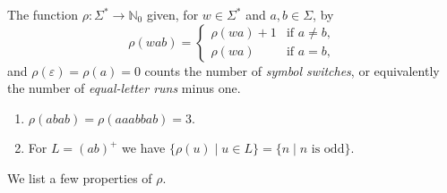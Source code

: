 \label{def:rho}
The function $\rho \colon \Sigma^* \to \mathbb N_0$ given, for $w \in \Sigma^*$ and $a,b \in \Sigma$, by
\[ 
\rho(wab) = \begin{cases} 
	\rho(wa) + 1 & \text{if } a \ne b, \\
	\rho(wa)     & \text{if } a = b,
\end{cases}
\]
and $\rho(\varepsilon) = \rho(a) = 0$ counts the number of \emph{symbol switches}, 
or equivalently the number of \emph{equal-letter runs} minus one.

\begin{example}
\begin{enumerate}
\item $\rho(abab) = \rho(aaabbab) = 3$.

\item For $L = (ab)^+$
we have $\{ \rho(u) \mid u \in L \} = \{ n \mid n \text{ is odd} \}$.
\end{enumerate}	
\end{example}

We list a few properties of $\rho$.

